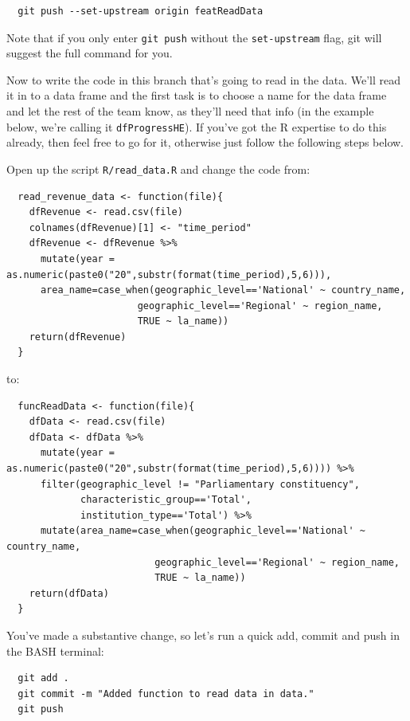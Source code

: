 \documentclass[
  12pt,
]{article}
\begin{document}
\begin{verbatim}
  git push --set-upstream origin featReadData
\end{verbatim}

Note that if you only enter \texttt{git\ push} without the
\texttt{set-upstream} flag, git will suggest the full command for you.

Now to write the code in this branch that's going to read in the data.
We'll read it in to a data frame and the first task is to choose a name
for the data frame and let the rest of the team know, as they'll need
that info (in the example below, we're calling it
\texttt{dfProgressHE}). If you've got the R expertise to do this
already, then feel free to go for it, otherwise just follow the
following steps below.

Open up the script \texttt{R/read\_data.R} and change the code from:

\begin{verbatim}
  read_revenue_data <- function(file){
    dfRevenue <- read.csv(file)
    colnames(dfRevenue)[1] <- "time_period"
    dfRevenue <- dfRevenue %>% 
      mutate(year = as.numeric(paste0("20",substr(format(time_period),5,6))),
      area_name=case_when(geographic_level=='National' ~ country_name,
                       geographic_level=='Regional' ~ region_name,
                       TRUE ~ la_name))
    return(dfRevenue)
  }
\end{verbatim}

to:

\begin{verbatim}
  funcReadData <- function(file){
    dfData <- read.csv(file)
    dfData <- dfData %>% 
      mutate(year = as.numeric(paste0("20",substr(format(time_period),5,6)))) %>%
      filter(geographic_level != "Parliamentary constituency",
             characteristic_group=='Total',
             institution_type=='Total') %>%
      mutate(area_name=case_when(geographic_level=='National' ~ country_name,
                          geographic_level=='Regional' ~ region_name,
                          TRUE ~ la_name))
    return(dfData)
  }
\end{verbatim}

You've made a substantive change, so let's run a quick add, commit and
push in the BASH terminal:

\begin{verbatim}
  git add .
  git commit -m "Added function to read data in data."
  git push
\end{verbatim}
\end{document}

